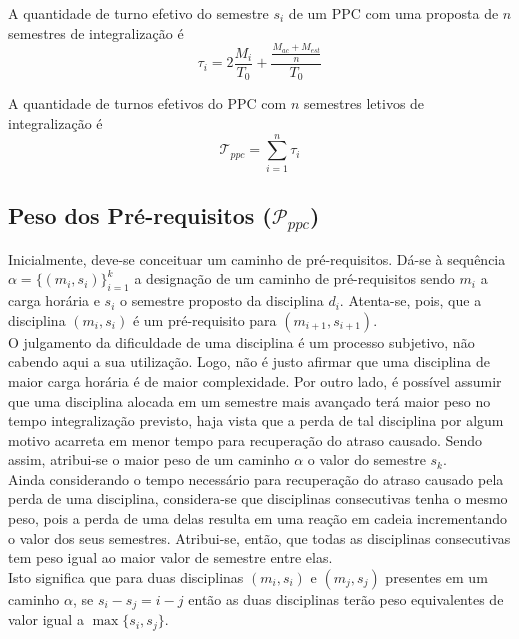 \documentclass[a4paper, 12pt]{article}
\begin{document}
\begin{definicao}
A quantidade de turno efetivo do semestre $s_i$ de um PPC com uma proposta de $n$ semestres  de integralização é \\

$$\tau_i = 2\frac{M_i}{T_0} + \frac{\frac{M_{ac}+M_{est}}{n}}{T_0}$$
\end{definicao}

\begin{definicao}
A quantidade de turnos efetivos do PPC com $n$ semestres letivos de integralização é \\
$$\mathcal{T}_{ppc} = \sum_{i = 1}^{n} \tau_i$$
\end{definicao}

\subsection*{Peso dos Pré-requisitos ($\mathcal{P}_{ppc}$)}

Inicialmente, deve-se conceituar um caminho de pré-requisitos. Dá-se à sequência $\alpha = \{ (m_i, s_i) \}_{i=1}^k$ a designação de um caminho de 
pré-requisitos sendo $m_i$ a carga horária e $s_i$ o semestre proposto da disciplina $d_i$. Atenta-se, pois, que a disciplina $(m_i, s_i)$ é um pré-requisito 
para $(m_{i+1}, s_{i+1})$. \\ 

O julgamento da dificuldade de uma disciplina é um processo subjetivo, não cabendo aqui a sua utilização. Logo, não é justo afirmar que uma disciplina de 
maior carga horária é de maior complexidade. Por outro lado, é possível assumir que uma disciplina alocada em um semestre mais avançado terá maior peso no 
tempo integralização previsto, haja vista que a perda de tal disciplina por algum motivo acarreta em menor tempo para recuperação do atraso causado.
Sendo assim, atribui-se o maior peso de um caminho $\alpha$ o valor do semestre $s_k$. \\

Ainda considerando o tempo necessário para recuperação do atraso causado pela perda de uma disciplina, considera-se que disciplinas consecutivas tenha o 
mesmo peso, pois a perda de uma delas resulta em uma reação em cadeia incrementando o valor dos seus semestres. Atribui-se, então, que todas as disciplinas 
consecutivas tem peso igual ao maior valor de semestre entre elas. \\

Isto significa que para duas disciplinas $(m_i, s_i)$ e $(m_j, s_j)$ presentes em um caminho $\alpha$, se $s_i - s_j = i - j$ então as duas disciplinas 
terão peso equivalentes de valor igual a $\max{\{ s_i, s_j \}}$. \\
\end{document}
